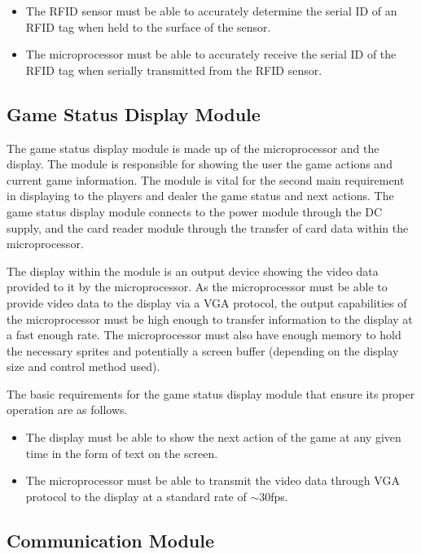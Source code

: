 \documentclass[12pt]{article}
\begin{document}
\begin{itemize}
\item The RFID sensor must be able to accurately determine the serial ID of an RFID tag when held to the surface of the sensor.
\item The microprocessor must be able to accurately receive the serial ID of the RFID tag when serially transmitted from the RFID sensor.
\end{itemize} 

\subsection{Game Status Display Module}

The game status display module is made up of the microprocessor and the display. The module is responsible for showing the user the game actions and current game information. The module is vital for the second main requirement in displaying to the players and dealer the game status and next actions. The game status display module connects to the power module through the DC supply, and the card reader module through the transfer of card data within the microprocessor.

The display within the module is an output device showing the video data provided to it by the microprocessor. As the microprocessor must be able to provide video data to the display via a VGA protocol, the output capabilities of the microprocessor must be high enough to transfer information to the display at a fast enough rate. The microprocessor must also have enough memory to hold the necessary sprites and potentially a screen buffer (depending on the display size and control method used).

The basic requirements for the game status display module that ensure its proper operation are as follows.

\begin{itemize}
\item The display must be able to show the next action of the game at any given time in the form of text on the screen.
\item The microprocessor must be able to transmit the video data through VGA protocol to the display at a standard rate of $\sim30$fps.
\end{itemize}

\subsection{Communication Module}
\end{document}
